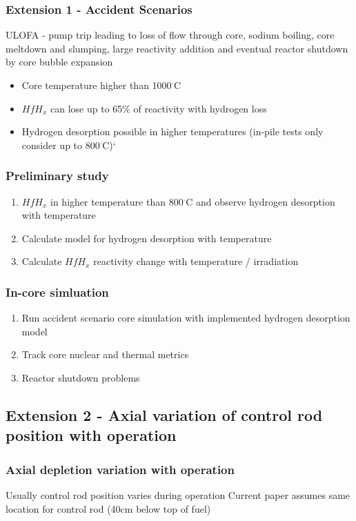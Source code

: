 \documentclass[9pt]{beamer}
\newcommand{\hfh}{$HfH_{x}$\xspace}
\begin{document}
\begin{frame}
\frametitle{Extension 1 - Accident Scenarios}
\gls{ULOFA} - pump trip leading to loss of flow through core, sodium boiling, core meltdown and slumping,
large reactivity addition and eventual reactor shutdown by core bubble expansion \cite{raghupathy_source_2017}
\begin{itemize}
    \item Core temperature higher than 1000$^\cdot$C
    \item \hfh can lose up to 65\% of reactivity with hydrogen loss
    \item Hydrogen desorption possible in higher temperatures (in-pile tests only consider up to 800$^\cdot$C)`
\end{itemize}
\end{frame}


\begin{frame}
\frametitle{Preliminary study}
\begin{enumerate}
    \item \hfh in higher temperature than 800$^\cdot$C and observe hydrogen desorption with temperature
    \item Calculate model for hydrogen desorption with temperature
    \item Calculate \hfh reactivity change with temperature / irradiation
\end{enumerate}
\end{frame}

\begin{frame}
\frametitle{In-core simluation}
\begin{enumerate}
    \item Run accident scenario core simulation with implemented hydrogen desorption
          model
    \item Track core nuclear and thermal metrics
    \item Reactor shutdown problems
\end{enumerate}
\end{frame}

\subsection{Extension 2 - Axial variation of control rod position with operation}

\begin{frame}
\frametitle{Axial depletion variation with operation}
Usually control rod position varies during operation
Current paper assumes same location for control rod (40cm below top of fuel)
\end{frame}
\end{document}
